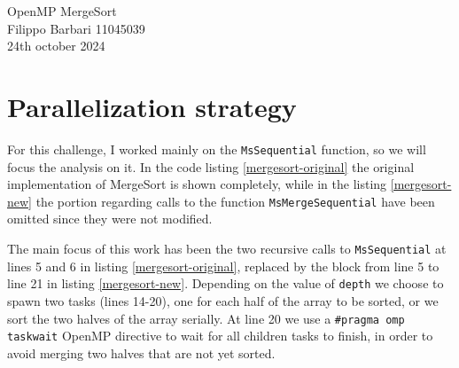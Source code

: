 \documentclass[11pt,a4paper,oneside]{book}
\begin{document}
	\begin{center}
		{\LARGE OpenMP MergeSort}\\
		Filippo Barbari 11045039\\
		24th october 2024
	\end{center}
	
	\section*{Parallelization strategy}
	For this challenge, I worked mainly on the \verb|MsSequential| function, so we will focus the analysis on it. In the code listing \ref{mergesort-original} the original implementation of MergeSort is shown completely, while in the listing \ref{mergesort-new} the portion regarding calls to the function \verb|MsMergeSequential| have been omitted since they were not modified.
	
	The main focus of this work has been the two recursive calls to \verb|MsSequential| at lines 5 and 6 in listing \ref{mergesort-original}, replaced by the block from line 5 to line 21 in listing \ref{mergesort-new}. Depending on the value of \verb|depth| we choose to spawn two tasks (lines 14-20), one for each half of the array to be sorted, or we sort the two halves of the array serially. At line 20 we use a \verb|#pragma omp taskwait| OpenMP directive to wait for all children tasks to finish, in order to avoid merging two halves that are not yet sorted.
	
\end{document}

